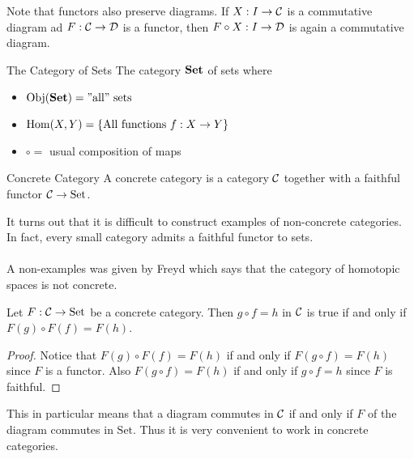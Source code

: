 \documentclass[a4paper]{article}
\begin{document}
Note that functors also preserve diagrams. If $X:I\to\mathcal{C}$ is a commutative diagram ad $F:\mathcal{C}\to\mathcal{D}$ is a functor, then $F\circ X:I\to\mathcal{D}$ is again a commutative diagram. 

\begin{defn}{The Category of Sets}{} The category $\bold{Set}$ of sets where 
\begin{itemize}
\item $\operatorname{Obj}(\bold{Set})=\text{''all'' sets}$
\item $\operatorname{Hom}(X,Y)=\{\text{All functions }f:X\to Y\}$
\item $\circ=$ usual composition of maps
\end{itemize}
\end{defn}

\begin{defn}{Concrete Category}{} A concrete category is a category $\mathcal{C}$ together with a faithful functor $\mathcal{C}\to\text{Set}$. 
\end{defn}

It turns out that it is difficult to construct examples of non-concrete categories. In fact, every small category admits a faithful functor to sets. \\~\\
A non-examples was given by Freyd which says that the category of homotopic spaces is not concrete. 

\begin{prp}{}{} Let $F:\mathcal{C}\to\text{Set}$ be a concrete category. Then $g\circ f=h$ in $\mathcal{C}$ is true if and only if $F(g)\circ F(f)=F(h)$. \tcbline
\begin{proof}
Notice that $F(g)\circ F(f)=F(h)$ if and only if $F(g\circ f)=F(h)$ since $F$ is a functor. Also $F(g\circ f)=F(h)$ if and only if $g\circ f=h$ since $F$ is faithful. 
\end{proof}
\end{prp}

This in particular means that a diagram commutes in $\mathcal{C}$ if and only if $F$ of the diagram commutes in $\text{Set}$. Thus it is very convenient to work in concrete categories. 
\end{document}

